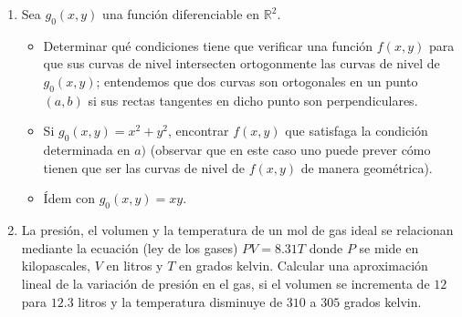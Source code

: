 \documentclass[11pt]{book}
\newcommand{\R}{\mathbb{R}}
\theoremstyle{definicion}
\theoremstyle{teorema}
\theoremstyle{ejemplo}
\begin{document}
\begin{enumerate}
\item Sea $g_0(x,y)$ una función diferenciable en $\R^2$. 
\begin{itemize}
\item[a)] Determinar qué condiciones tiene que verificar una función $f(x,y)$ para que sus curvas de nivel intersecten ortogonmente las curvas de nivel de $g_0(x,y)$; entendemos que dos curvas son ortogonales en un punto $(a,b)$ si sus rectas tangentes en dicho punto son perpendiculares.
\item[b)] Si $g_0(x,y)=x^2+y^2$, encontrar $f(x,y)$ que satisfaga la condición determinada en $a)$ (observar que en este caso uno puede prever cómo tienen que ser las curvas de nivel de $f(x,y)$ de manera geométrica).

\item[c)] Ídem con $g_0(x,y)=xy$.
\end{itemize}







\item 
La presi\'{o}n, el volumen y la temperatura de un mol de gas ideal se
relacionan mediante la ecuaci\'{o}n (ley de los gases) $PV=8.31T$ donde $P$ se mide en
kilopascales, $V$ en litros y $T$ en grados kelvin. Calcular una aproximación lineal de la variación de presi\'{o}n en el gas, si el volumen se incrementa
de $12$ para $12{.}3$ litros y la temperatura disminuye de $310$ a $305$ grados kelvin.





\end{enumerate}
\end{document}
